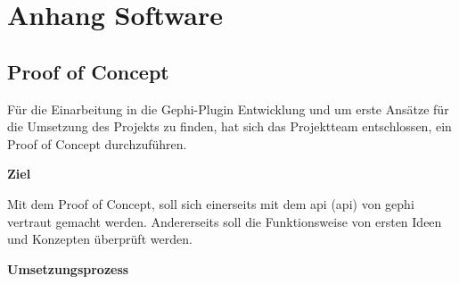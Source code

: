 \chapter{Anhang Software}

\section{Proof of Concept}
\label{poc}

Für die Einarbeitung in die Gephi-Plugin Entwicklung und um erste Ansätze für die Umsetzung des Projekts zu finden, hat
sich das Projektteam entschlossen, ein Proof of Concept durchzuführen.

\textbf{Ziel}

Mit dem Proof of Concept, soll sich einerseits mit dem \acl{api} (\acs{api}) von \acs{gephi} vertraut gemacht werden.
Andererseits soll die Funktionsweise von ersten Ideen und Konzepten überprüft werden.

\textbf{Umsetzungsprozess}

